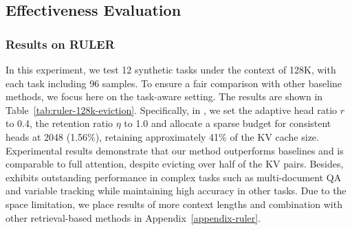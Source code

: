 \subsection{Effectiveness Evaluation}
\label{acc_experiments}

% 
\subsubsection{Results on RULER}
In this experiment, we test 12 synthetic tasks under the context of 128K, with each task including 96 samples. To ensure a fair comparison with other baseline methods, we focus here on the task-aware setting.
The results are shown in Table~\ref{tab:ruler-128k-eviction}. 
Specifically, in \shortname, we set the adaptive head ratio $r$ to 0.4, the retention ratio $\eta$ to 1.0 and allocate a sparse budget for consistent heads at 2048 (1.56\%), retaining approximately 41\% of the KV cache size. 
Experimental results demonstrate that our method outperforms baselines and is comparable to full attention, despite evicting over half of the KV pairs.
Besides, \shortname exhibits outstanding performance in complex tasks such as multi-document QA and variable tracking while maintaining high accuracy in other tasks. Due to the space limitation, we place results of more context lengths and combination with other retrieval-based methods in Appendix~\ref{appendix-ruler}.



